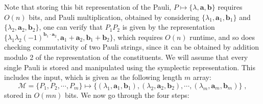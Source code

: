 \documentclass[10pt,aps,pra,twocolumn,floatfix,nofootinbib,superscriptaddress,longbibliography]{revtex4-2}
\newcommand{\1}{\mathbbm{1}}
\begin{document}
Note that storing this bit representation of the Pauli, $P \mapsto \{\lambda , \mathbf a , \mathbf b\}$ requires $O(n)$ bits, and Pauli multiplication, obtained by considering $\{\lambda_1, \mathbf a_1, \mathbf b_1\}$ and $\{\lambda_2, \mathbf a_2, \mathbf b_2\}$, one can verify that $P_1 P_2$ is given by the representation $\{\lambda_1 \lambda_2(-1)^{\mathbf b_1\cdot \mathbf a_2}, \mathbf a_1 + \mathbf a_2, \mathbf b_1 + \mathbf b_2\}$, which requires $O(n)$ runtime, and so does checking commutativity of two Pauli strings, since it can be obtained by addition modulo 2 of the representation of the constituents. We will assume that every single Pauli is stored and manipulated using the symplectic representation. This includes the input, which is given as the following length $m$ array:
\begin{equation}
\mathcal M = \{P_1, P_2, \cdots, P_m\} \mapsto \{(\lambda_1, \mathbf a_1, \mathbf b_1),(\lambda_2, \mathbf a_2, \mathbf b_2), \cdots,  (\lambda_m, \mathbf a_m, \mathbf b_m)\}\;,
\end{equation}
stored in $O(mn)$ bits. We now go through the four steps:
\end{document}
